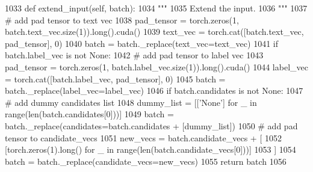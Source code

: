 \begin{DoxyCode}
1033     \textcolor{keyword}{def }extend\_input(self, batch):
1034         \textcolor{stringliteral}{"""}
1035 \textcolor{stringliteral}{        Extend the input.}
1036 \textcolor{stringliteral}{        """}
1037         \textcolor{comment}{# add pad tensor to text vec}
1038         pad\_tensor = torch.zeros(1, batch.text\_vec.size(1)).long().cuda()
1039         text\_vec = torch.cat([batch.text\_vec, pad\_tensor], 0)
1040         batch = batch.\_replace(text\_vec=text\_vec)
1041         \textcolor{keywordflow}{if} batch.label\_vec \textcolor{keywordflow}{is} \textcolor{keywordflow}{not} \textcolor{keywordtype}{None}:
1042             \textcolor{comment}{# add pad tensor to label vec}
1043             pad\_tensor = torch.zeros(1, batch.label\_vec.size(1)).long().cuda()
1044             label\_vec = torch.cat([batch.label\_vec, pad\_tensor], 0)
1045             batch = batch.\_replace(label\_vec=label\_vec)
1046         \textcolor{keywordflow}{if} batch.candidates \textcolor{keywordflow}{is} \textcolor{keywordflow}{not} \textcolor{keywordtype}{None}:
1047             \textcolor{comment}{# add dummy candidates list}
1048             dummy\_list = [[\textcolor{stringliteral}{'None'}] \textcolor{keywordflow}{for} \_ \textcolor{keywordflow}{in} range(len(batch.candidates[0]))]
1049             batch = batch.\_replace(candidates=batch.candidates + [dummy\_list])
1050             \textcolor{comment}{# add pad tensor to candidate\_vecs}
1051             new\_vecs = batch.candidate\_vecs + [
1052                 [torch.zeros(1).long() \textcolor{keywordflow}{for} \_ \textcolor{keywordflow}{in} range(len(batch.candidate\_vecs[0]))]
1053             ]
1054             batch = batch.\_replace(candidate\_vecs=new\_vecs)
1055         \textcolor{keywordflow}{return} batch
1056 
\end{DoxyCode}
\mbox{\label{classprojects_1_1controllable__dialogue_1_1controllable__seq2seq_1_1controllable__seq2seq_1_1ControllableSeq2seqAgent_ac416a9eb7ee7b0b1984468a4ec0b057c}} 
